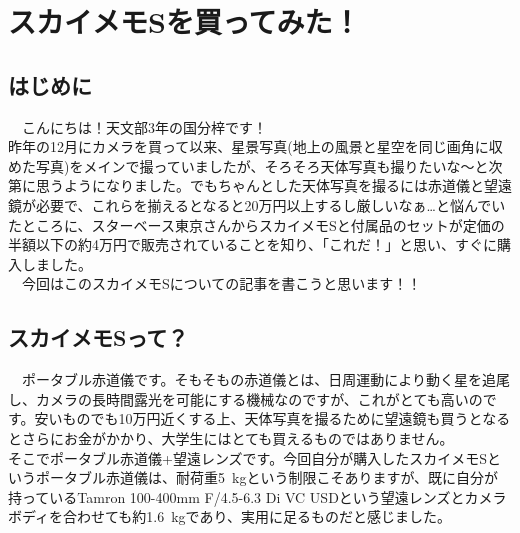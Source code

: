 \chapter{スカイメモSを買ってみた！}

\section{はじめに}
　こんにちは！天文部3年の国分梓です！\\

昨年の12月にカメラを買って以来、星景写真(地上の風景と星空を同じ画角に収めた写真)をメインで撮っていましたが、そろそろ天体写真も撮りたいな～と次第に思うようになりました。でもちゃんとした天体写真を撮るには赤道儀と望遠鏡が必要で、これらを揃えるとなると20万円以上するし厳しいなぁ\dots と悩んでいたところに、スターベース東京さんからスカイメモSと付属品のセットが定価の半額以下の約4万円で販売されていることを知り、「これだ！」と思い、すぐに購入しました。\\
　今回はこのスカイメモSについての記事を書こうと思います！！



\section{スカイメモSって？}
　ポータブル赤道儀です。そもそもの赤道儀とは、日周運動により動く星を追尾し、カメラの長時間露光を可能にする機械なのですが、これがとても高いのです。安いものでも10万円近くする上、天体写真を撮るために望遠鏡も買うとなるとさらにお金がかかり、大学生にはとても買えるものではありません。\\

そこでポータブル赤道儀+望遠レンズです。今回自分が購入したスカイメモSというポータブル赤道儀は、耐荷重\SI{5}{kg}という制限こそありますが、既に自分が持っているTamron 100-400mm F/4.5-6.3 Di VC USDという望遠レンズとカメラボディを合わせても約\SI{1.6}{kg}であり、実用に足るものだと感じました。

